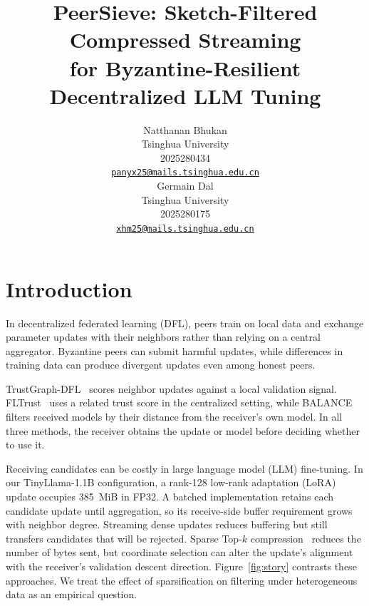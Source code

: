 \documentclass{article}
\title{PeerSieve: Sketch-Filtered Compressed Streaming\\for Byzantine-Resilient Decentralized LLM Tuning}
\author{%
  Natthanan Bhukan \\
  Tsinghua University \\
  2025280434 \\
  \href{mailto:panyx25@mails.tsinghua.edu.cn}{\texttt{panyx25@mails.tsinghua.edu.cn}} \\
  \And
  Germain Dal \\
  Tsinghua University \\
  2025280175 \\
  \href{mailto:xhm25@mails.tsinghua.edu.cn}{\texttt{xhm25@mails.tsinghua.edu.cn}} \\
}
\begin{document}
\raggedbottom
\maketitle

\section{Introduction}
\label{sec:motivation}

In decentralized federated learning (DFL), peers train on local data and exchange parameter updates with their neighbors rather than relying on a central aggregator. Byzantine peers can submit harmful updates, while differences in training data can produce divergent updates even among honest peers.

TrustGraph-DFL~\cite{trustgraph2026} scores neighbor updates against a local validation signal. FLTrust~\cite{cao2021fltrust} uses a related trust score in the centralized setting, while BALANCE~\cite{fang2024balance} filters received models by their distance from the receiver's own model. In all three methods, the receiver obtains the update or model before deciding whether to use it.

Receiving candidates can be costly in large language model (LLM) fine-tuning. In our TinyLlama-1.1B configuration, a rank-128 low-rank adaptation (LoRA) update occupies 385~MiB in FP32. A batched implementation retains each candidate update until aggregation, so its receive-side buffer requirement grows with neighbor degree. Streaming dense updates reduces buffering but still transfers candidates that will be rejected. Sparse Top-$k$ compression~\cite{karimireddy2019efsgd} reduces the number of bytes sent, but coordinate selection can alter the update's alignment with the receiver's validation descent direction. Figure~\ref{fig:story} contrasts these approaches. We treat the effect of sparsification on filtering under heterogeneous data as an empirical question.
\end{document}
